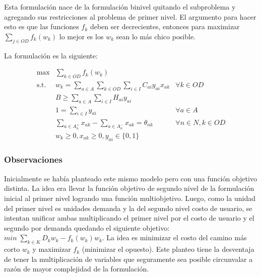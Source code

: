 \documentclass{article}
\begin{document}
  Esta formulación nace de la formulación binivel quitando el subproblema y agregando sus restricciones al problema de primer nivel. El argumento para hacer esto es que las funciones $f_k$ deben ser decrecientes, entonces para maximizar $\sum_{j \in OD}f_k(w_k)$ lo mejor es los $w_k$ sean lo más chico posible.

  La formulación es la siguiente:

  \begin{align}
    \text{max}    & \sum_{k \in OD} f_k(w_k)                                                         & \label{eq:objectivealt} \\
    \text{s.t.}\; & w_k = \sum_{a \in A} \sum_{k \in OD} \sum_{i \in I} C_{ai}y_{ai}x_{ak}           & \forall k \in OD \label{eq:shortestpathalt} \\
                  & B \geq \sum_{a \in A} \sum_{i \in I} H_{ai}y_{ai}                                & \label{eq:respectbudgetalt} \\
                  & 1 = \sum_{i \in I} y_{ai}                                                        & \forall a \in A \label{eq:alwaysoneyalt} \\
                  & \sum_{a \in A_n^+} x_{ak} - \sum_{a \in A_n^-} x_{ak} = \theta_{nk}              & \forall n \in N, k \in OD \label{eq:flowbalancealt} \\
                  & w_k \geq 0, x_{ak} \geq 0, y_{ai} \in \{0,1\}                                    & \nonumber
  \end{align}

  \subsubsection*{Observaciones}

  Inicialmente se había planteado este mismo modelo pero con una función objetivo distinta. La idea era llevar la función objetivo de segundo nivel de la formulación inicial al primer nivel logrando una función multiobjetivo. Luego, como la unidad del primer nivel es unidades demanda y la del segundo nivel costo de usuario, se intentan unificar ambas multiplicando el primer nivel por el costo de usuario y el segundo por demanda quedando el siguiente objetivo: $min\;\sum_{k \in K} D_kw_k - f_k(w_k)w_k$. La idea es minimizar el costo del camino más corto $w_k$ y maximizar $f_k$ (minimizar el opuesto). Este planteo tiene la desventaja de tener la multiplicación de variables que seguramente sea posible circunvalar a razón de mayor complejidad de la formulación.
\end{document}
